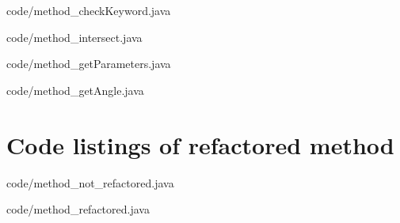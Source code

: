 \documentclass[conference]{IEEEtran}
\begin{document}

{code/method_checkKeyword.java}


{code/method_intersect.java}


{code/method_getParameters.java}


{code/method_getAngle.java}

\section{Code listings of refactored method}

{code/method_not_refactored.java}	


{code/method_refactored.java}
\end{document}
